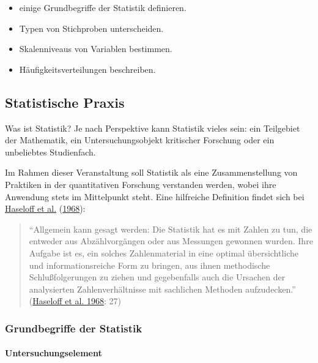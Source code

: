 \documentclass[
  ngerman,
]{article}
\providecommand{\tightlist}{%
  \setlength{\itemsep}{0pt}\setlength{\parskip}{0pt}}
\begin{document}
\begin{itemize}
\tightlist
\item
  einige Grundbegriffe der Statistik definieren.
\item
  Typen von Stichproben unterscheiden.
\item
  Skalenniveaus von Variablen bestimmen.
\item
  Häufigkeitsverteilungen beschreiben.
\end{itemize}

\hypertarget{statistische-praxis}{%
\subsection{Statistische Praxis}\label{statistische-praxis}}

Was ist Statistik? Je nach Perspektive kann Statistik vieles sein: ein Teilgebiet der Mathematik, ein Untersuchungsobjekt kritischer Forschung oder ein unbeliebtes Studienfach.

Im Rahmen dieser Veranstaltung soll Statistik als eine Zusammenstellung von Praktiken in der quantitativen Forschung verstanden werden, wobei ihre Anwendung stets im Mittelpunkt steht. Eine hilfreiche Definition findet sich bei \protect\hyperlink{ref-haseloff}{Haseloff et al.} (\protect\hyperlink{ref-haseloff}{1968}):

\begin{quote}
``Allgemein kann gesagt werden: Die Statistik hat es mit Zahlen zu tun, die entweder aus Abzählvorgängen oder aus Messungen gewonnen wurden. Ihre Aufgabe ist es, ein solches Zahlenmaterial in eine optimal übersichtliche und informationsreiche Form zu bringen, aus ihnen methodische Schlußfolgerungen zu ziehen und gegebenfalls auch die Ursachen der analysierten Zahlenverhältnisse mit sachlichen Methoden aufzudecken.'' (\protect\hyperlink{ref-haseloff}{Haseloff et al. 1968}: 27)
\end{quote}

\hypertarget{grundbegriffe-der-statistik}{%
\subsubsection{Grundbegriffe der Statistik}\label{grundbegriffe-der-statistik}}

\hypertarget{untersuchungselement}{%
\paragraph{Untersuchungselement}\label{untersuchungselement}}
\end{document}
